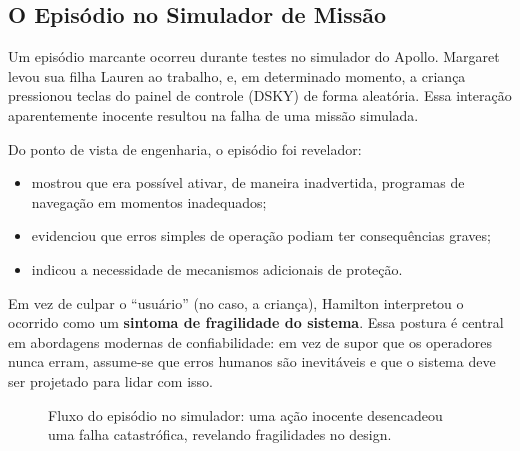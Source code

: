 \documentclass[12pt,a4paper]{report}
\begin{document}
\subsection{O Episódio no Simulador de Missão}

Um episódio marcante ocorreu durante testes no simulador do Apollo. Margaret
levou sua filha Lauren ao trabalho, e, em determinado momento, a criança
pressionou teclas do painel de controle (DSKY) de forma aleatória. Essa
interação aparentemente inocente resultou na falha de uma missão simulada.

Do ponto de vista de engenharia, o episódio foi revelador:
\begin{itemize}[nosep]
    \item mostrou que era possível ativar, de maneira inadvertida, programas
    de navegação em momentos inadequados;
    \item evidenciou que erros simples de operação podiam ter consequências
    graves;
    \item indicou a necessidade de mecanismos adicionais de proteção.
\end{itemize}

Em vez de culpar o ``usuário'' (no caso, a criança), Hamilton interpretou o
ocorrido como um \textbf{sintoma de fragilidade do sistema}. Essa postura é
central em abordagens modernas de confiabilidade: em vez de supor que os
operadores nunca erram, assume-se que erros humanos são inevitáveis e que o
sistema deve ser projetado para lidar com isso.

\begin{figure}[h]
    \centering
    \caption{Fluxo do episódio no simulador: uma ação inocente desencadeou uma falha catastrófica, revelando fragilidades no design.}
\end{figure}
\end{document}
